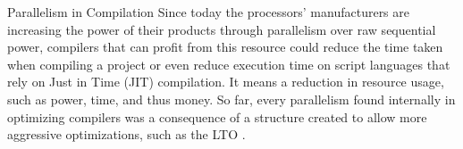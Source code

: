 \begin{section}{Parallelism in Compilation}
Since today the processors' manufacturers are increasing the power of their
products through parallelism over raw sequential power, compilers that can
profit from this resource could reduce the time taken when compiling a project
or even reduce execution time on script languages that rely on Just in Time
(JIT) compilation. It means a reduction in resource usage, such as
power, time, and thus money. So far, every parallelism found internally in
optimizing compilers was a consequence of a structure created to allow more
aggressive optimizations, such as the LTO \citep{glek2010optimizing}.


\end{section}

